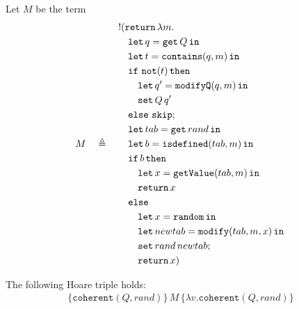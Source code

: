 \begin{lemma}\label{lemma:oracle-coherence}
Let $M$ be the term 
\begin{align*}
M \quad\triangleq\quad
\begin{aligned}
    &\mathord{!} (\mathtt{return}\, \lambda m. \\
    &\quad \mathtt{let}\,q=\mathtt{get}\, Q\,\mathtt{in}\, \\
    &\quad\mathtt{let}\,t=\mathtt{contains}(q,m)\,\mathtt{in}\, \\
    &\quad \mathtt{if}\ \mathtt{not}(t)\,\mathtt{then} \\
    &\quad\quad \mathtt{let}\,q'=\mathtt{modifyQ}(q,m)\,\mathtt{in}\, \\
    &\quad\quad \mathtt{set}\,Q\, q' \\
    &\quad\mathtt{else}\ \mathtt{skip}{}; \\
    &\quad\mathtt{let}\,tab = \mathtt{get}\,rand\,\mathtt{in}\, \\
    &\quad\mathtt{let}\,b = \mathtt{isdefined}(tab, m)\,\mathtt{in}\, \\
    &\quad\mathtt{if}\, b\, \mathtt{then} \\
    &\quad\quad \mathtt{let}\,x = \mathtt{getValue}(tab, m)\,\mathtt{in}\, \\
    &\quad\quad \mathtt{return}\, x \\
    &\quad\mathtt{else} \\
    &\quad\quad \mathtt{let}\,x = \mathtt{random}\,\mathtt{in}\, \\
    &\quad\quad \mathtt{let}\,newtab = \mathtt{modify}(tab, m, x)\,\mathtt{in}\, \\
    &\quad\quad \mathtt{set}\,rand\,newtab; \\
    &\quad\quad \mathtt{return}\, x)
\end{aligned}
\end{align*}

The following Hoare triple holds:
\begin{align*}
\{\mathtt{coherent}(Q, rand)\}\,M\,\{\lambda v.\mathtt{coherent}(Q, rand)\}
\end{align*}
\end{lemma}

